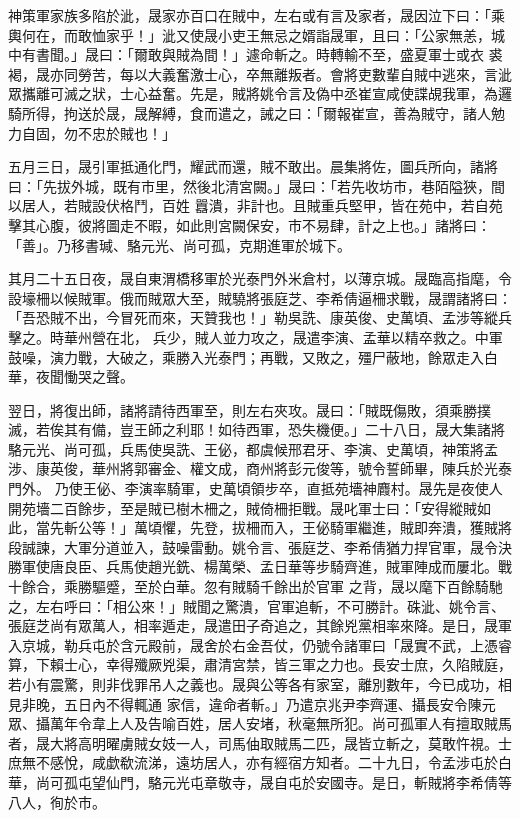 \begin{pinyinscope}
 神策軍家族多陷於泚，晟家亦百口在賊中，左右或有言及家者，晟因泣下曰：「乘輿何在，而敢恤家乎！」泚又使晟小吏王無忌之婿詣晟軍，且曰：「公家無恙，城中有書聞。」晟曰：「爾敢與賊為間！」遽命斬之。時轉輸不至，盛夏軍士或衣
 裘褐，晟亦同勞苦，每以大義奮激士心，卒無離叛者。會將吏數輩自賊中逃來，言泚眾攜離可滅之狀，士心益奮。先是，賊將姚令言及偽中丞崔宣咸使諜覘我軍，為邏騎所得，拘送於晟，晟解縛，食而遣之，誡之曰：「爾報崔宣，善為賊守，諸人勉力自固，勿不忠於賊也！」



 五月三日，晟引軍抵通化門，耀武而還，賊不敢出。晨集將佐，圖兵所向，諸將曰：「先拔外城，既有市里，然後北清宮闕。」晟曰：「若先收坊市，巷陌隘狹，間以居人，若賊設伏格鬥，百姓
 囂潰，非計也。且賊重兵堅甲，皆在苑中，若自苑擊其心腹，彼將圖走不暇，如此則宮闕保安，市不易肆，計之上也。」諸將曰：「善」。乃移書瑊、駱元光、尚可孤，克期進軍於城下。



 其月二十五日夜，晟自東渭橋移軍於光泰門外米倉村，以薄京城。晟臨高指麾，令設壕柵以候賊軍。俄而賊眾大至，賊驍將張庭芝、李希倩逼柵求戰，晟謂諸將曰：「吾恐賊不出，今冒死而來，天贊我也！」勒吳詵、康英俊、史萬頃、孟涉等縱兵擊之。時華州營在北，
 兵少，賊人並力攻之，晟遣李演、孟華以精卒救之。中軍鼓噪，演力戰，大破之，乘勝入光泰門；再戰，又敗之，殭尸蔽地，餘眾走入白華，夜聞慟哭之聲。



 翌日，將復出師，諸將請待西軍至，則左右夾攻。晟曰：「賊既傷敗，須乘勝撲滅，若俟其有備，豈王師之利耶！如待西軍，恐失機便。」二十八日，晟大集諸將駱元光、尚可孤，兵馬使吳詵、王佖，都虞候邢君牙、李演、史萬頃，神策將孟涉、康英俊，華州將郭審金、權文成，商州將彭元俊等，號令誓師畢，陳兵於光泰門外。
 乃使王佖、李演率騎軍，史萬頃領步卒，直抵苑墻神麚村。晟先是夜使人開苑墻二百餘步，至是賊已樹木柵之，賊倚柵拒戰。晟叱軍士曰：「安得縱賊如此，當先斬公等！」萬頃懼，先登，拔柵而入，王佖騎軍繼進，賊即奔潰，獲賊將段誠諫，大軍分道並入，鼓噪雷動。姚令言、張庭芝、李希倩猶力捍官軍，晟令決勝軍使唐良臣、兵馬使趙光銑、楊萬榮、孟日華等步騎齊進，賊軍陣成而屢北。戰十餘合，乘勝驅蹙，至於白華。忽有賊騎千餘出於官軍
 之背，晟以麾下百餘騎馳之，左右呼曰：「相公來！」賊聞之驚潰，官軍追斬，不可勝計。硃泚、姚令言、張庭芝尚有眾萬人，相率遁走，晟遣田子奇追之，其餘兇黨相率來降。是日，晟軍入京城，勒兵屯於含元殿前，晟舍於右金吾仗，仍號令諸軍曰「晟實不武，上憑睿算，下賴士心，幸得殲厥兇渠，肅清宮禁，皆三軍之力也。長安士庶，久陷賊庭，若小有震驚，則非伐罪吊人之義也。晟與公等各有家室，離別數年，今已成功，相見非晚，五日內不得輒通
 家信，違命者斬。」乃遣京兆尹李齊運、攝長安令陳元眾、攝萬年令韋上人及告喻百姓，居人安堵，秋毫無所犯。尚可孤軍人有擅取賊馬者，晟大將高明曜虜賊女妓一人，司馬伷取賊馬二匹，晟皆立斬之，莫敢忤視。士庶無不感悅，咸歔欷流涕，遠坊居人，亦有經宿方知者。二十九日，令孟涉屯於白華，尚可孤屯望仙門，駱元光屯章敬寺，晟自屯於安國寺。是日，斬賊將李希倩等八人，徇於市。




\end{pinyinscope}
